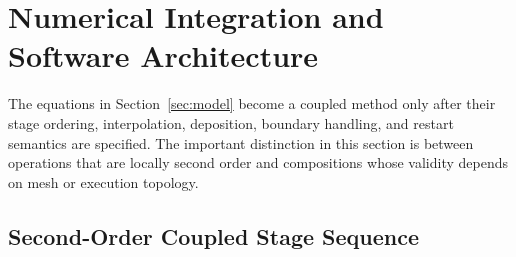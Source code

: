 \documentclass[twocolumn]{aastex701}
\begin{document}
\section{Numerical Integration and Software Architecture}
\label{sec:numerics}

The equations in Section~\ref{sec:model} become a coupled method only after
their stage ordering, interpolation, deposition, boundary handling, and
restart semantics are specified. The important distinction in this section is
between operations that are locally second order and compositions whose
validity depends on mesh or execution topology.

\subsection{Second-Order Coupled Stage Sequence}
\end{document}
